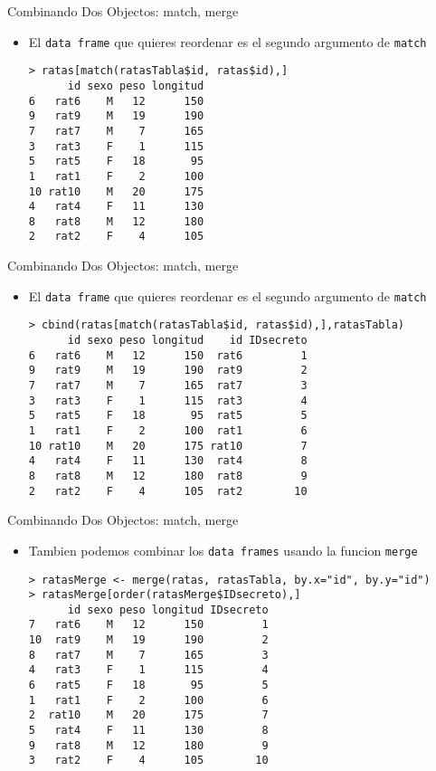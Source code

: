 \documentclass{beamer}
\begin{document}
\begin{frame}[fragile]{Combinando Dos Objectos: match, merge}
\begin{itemize}
\item El \texttt{data frame} que quieres reordenar es el segundo argumento de \verb=match=
\footnotesize
\begin{verbatim}
> ratas[match(ratasTabla$id, ratas$id),] 
      id sexo peso longitud
6   rat6    M   12      150
9   rat9    M   19      190
7   rat7    M    7      165
3   rat3    F    1      115
5   rat5    F   18       95
1   rat1    F    2      100
10 rat10    M   20      175
4   rat4    F   11      130
8   rat8    M   12      180
2   rat2    F    4      105
\end{verbatim}
\end{itemize}
\end{frame}

\begin{frame}[fragile]{Combinando Dos Objectos: match, merge}
\begin{itemize}
\item El \texttt{data frame} que quieres reordenar es el segundo argumento de \verb=match=
\footnotesize
\begin{verbatim}
> cbind(ratas[match(ratasTabla$id, ratas$id),],ratasTabla)
      id sexo peso longitud    id IDsecreto
6   rat6    M   12      150  rat6         1
9   rat9    M   19      190  rat9         2
7   rat7    M    7      165  rat7         3
3   rat3    F    1      115  rat3         4
5   rat5    F   18       95  rat5         5
1   rat1    F    2      100  rat1         6
10 rat10    M   20      175 rat10         7
4   rat4    F   11      130  rat4         8
8   rat8    M   12      180  rat8         9
2   rat2    F    4      105  rat2        10
\end{verbatim}
\end{itemize}
\end{frame}

\begin{frame}[fragile]{Combinando Dos Objectos: match, merge}
\begin{itemize}
\item Tambien podemos combinar los \texttt{data frames} usando la funcion \verb=merge=
\footnotesize
\begin{verbatim}
> ratasMerge <- merge(ratas, ratasTabla, by.x="id", by.y="id")
> ratasMerge[order(ratasMerge$IDsecreto),]
      id sexo peso longitud IDsecreto
7   rat6    M   12      150         1
10  rat9    M   19      190         2
8   rat7    M    7      165         3
4   rat3    F    1      115         4
6   rat5    F   18       95         5
1   rat1    F    2      100         6
2  rat10    M   20      175         7
5   rat4    F   11      130         8
9   rat8    M   12      180         9
3   rat2    F    4      105        10
\end{verbatim}
\end{itemize}
\end{frame}
\end{document}
